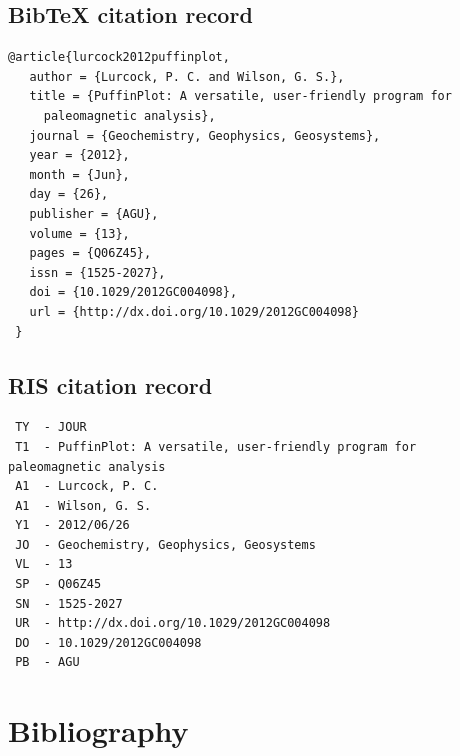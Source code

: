 \documentclass[a4paper,british]{article}
\begin{document}
\subsection*{BibTeX citation record}

\begin{verbatim}
@article{lurcock2012puffinplot,
   author = {Lurcock, P. C. and Wilson, G. S.},
   title = {PuffinPlot: A versatile, user-friendly program for
     paleomagnetic analysis},
   journal = {Geochemistry, Geophysics, Geosystems},
   year = {2012},
   month = {Jun},
   day = {26},
   publisher = {AGU},
   volume = {13},
   pages = {Q06Z45},
   issn = {1525-2027},
   doi = {10.1029/2012GC004098},
   url = {http://dx.doi.org/10.1029/2012GC004098}
 }
\end{verbatim}

\subsection*{RIS citation record}

\begin{verbatim}
 TY  - JOUR
 T1  - PuffinPlot: A versatile, user-friendly program for paleomagnetic analysis
 A1  - Lurcock, P. C.
 A1  - Wilson, G. S.
 Y1  - 2012/06/26
 JO  - Geochemistry, Geophysics, Geosystems
 VL  - 13
 SP  - Q06Z45
 SN  - 1525-2027
 UR  - http://dx.doi.org/10.1029/2012GC004098
 DO  - 10.1029/2012GC004098
 PB  - AGU
\end{verbatim}

\section{Bibliography}


\end{document}
